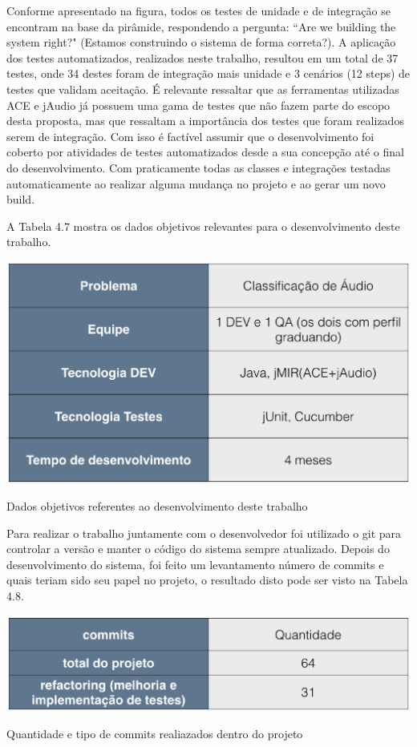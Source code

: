 Conforme apresentado na figura, todos os testes de unidade e de integração se encontram na base da pirâmide, respondendo a pergunta: ``Are we building the system right?" (Estamos construindo o sistema de forma correta?).  A  aplicação dos testes automatizados, realizados neste trabalho, resultou  em um total de 37 testes, onde 34 destes foram de integração mais unidade e 3 cenários (12 steps) de testes que validam aceitação. É relevante ressaltar que as ferramentas utilizadas ACE e jAudio já possuem uma gama de testes que não fazem parte do escopo desta proposta, mas que ressaltam a importância dos testes que foram realizados serem de integração. Com isso é factível assumir que o desenvolvimento foi coberto por atividades de testes automatizados desde a sua concepção até o final do desenvolvimento. Com praticamente todas as classes e integrações testadas automaticamente ao realizar alguma mudança no projeto e ao gerar um novo build. 

A Tabela 4.7 mostra os dados objetivos relevantes para o desenvolvimento deste trabalho.

\begin{table}[H]
	\centering
	\captionsetup{justification=centering,margin=2cm}
	\includegraphics[scale=0.50]{capitulos/validacao/figuras/dadosObj1.eps}
	\caption{Dados objetivos referentes ao desenvolvimento deste trabalho}
	\label{fig:result-engajamento}
\end{table}

Para realizar o trabalho juntamente com o desenvolvedor foi utilizado o git para controlar a versão e manter o código do sistema sempre atualizado. Depois do desenvolvimento do sistema, foi feito um levantamento número de commits e quais teriam sido seu papel no projeto, o resultado disto pode ser visto na Tabela 4.8.

\begin{table}[H]
	\centering
	\captionsetup{justification=centering,margin=2cm}
	\includegraphics[scale=0.55]{capitulos/validacao/figuras/dadosObj15.eps}
	\caption{Quantidade e tipo de commits realiazados dentro do projeto}
	\label{fig:result-engajamento}
\end{table}

